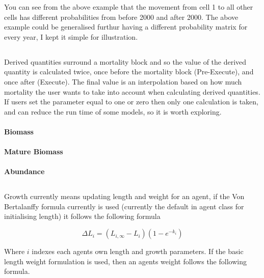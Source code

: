 You can see from the above example that the movement from cell 1 to all other cells has different probabilities from before 2000 and after 2000. The above example could be generalised furthur having a different probability matrix for every year, I kept it simple for illustration.

\subsection{\label{sec:derived-quantities}}
Derived quantities surround a mortality block and so the value of the derived quantity is calculated twice, once before the mortality block (Pre-Execute), and once after (Execute). The final value is an interpolation based on how much mortality the user wants to take into account when calculating derived quantities. If users set the  parameter equal to one or zero then only one calculation is taken, and can reduce the run time of some models, so it is worth exploring.
\paragraph*{Biomass}

\paragraph*{Mature Biomass}

\paragraph*{Abundance}

\subsection{\label{sec:age-at-age}}
Growth currently means updating length and weight for an agent, if the Von Bertalanffy formula currently is used (currently the default in agent class for initialising length) it follows the following formula

\begin{equation}\label{VB}
	\Delta L_i = (L_{i,\infty} - L_i)(1 - e^{-k_i})
\end{equation}


Where $i$ indexes each agents own length and growth parameters. If the basic length weight formulation is used, then an agents weight follows the following formula.

